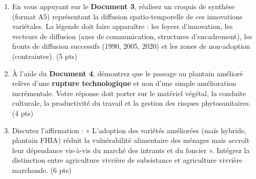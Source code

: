 \documentclass[11pt]{article}
\begin{document}
\begin{exercice}
\begin{enumerate}
    \item En vous appuyant sur le \textbf{Document 3}, réalisez un croquis de synthèse (format A5) représentant la diffusion spatio-temporelle de ces innovations variétales. La légende doit faire apparaître : les foyers d'innovation, les vecteurs de diffusion (axes de communication, structures d'encadrement), les fronts de diffusion successifs (1990, 2005, 2020) et les zones de non-adoption (contraintes). \hfill (5 pts)
    \item À l'aide du \textbf{Document 4}, démontrez que le passage au plantain amélioré relève d'une \textbf{rupture technologique} et non d'une simple amélioration incrémentale. Votre réponse doit porter sur le matériel végétal, la conduite culturale, la productivité du travail et la gestion des risques phytosanitaires. \hfill (4 pts)
    \item Discutez l'affirmation : « L'adoption des variétés améliorées (maïs hybride, plantain FHIA) réduit la vulnérabilité alimentaire des ménages mais accroît leur dépendance vis-à-vis du marché des intrants et du foncier ». Intégrez la distinction entre agriculture vivrière de subsistance et agriculture vivrière marchande. \hfill (6 pts)
\end{enumerate}
\end{exercice}
\end{document}
